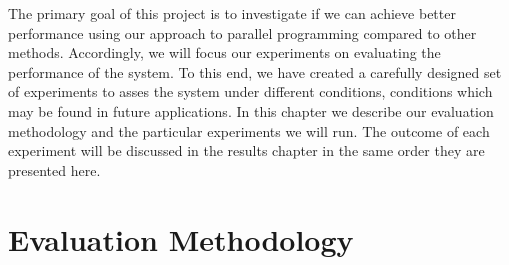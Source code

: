 






The primary goal of this project is to investigate if we can achieve better performance using our approach to parallel programming compared to other methods. Accordingly, we will focus our experiments on evaluating the performance of the system. To this end, we have created a carefully designed set of experiments to asses the system under different conditions, conditions which may be found in future applications. In this chapter we describe our evaluation methodology and the particular experiments we will run. The outcome of each experiment will be discussed in the results chapter in the same order they are presented here.



\section{Evaluation Methodology}

